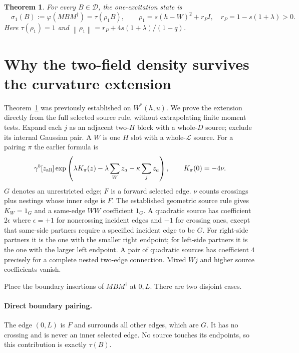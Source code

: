 \documentclass[11pt]{article}
\newcommand{\norm}[1]{\left\lVert#1\right\rVert}
\newcommand{\D}{\mathcal D}
\newtheorem{theorem}{Theorem}
\begin{document}
\begin{theorem}\label{density}
For every $B\in\D$, the one-excitation state is
\begin{equation}\boxed{\quad
 \sigma_1(B):=\varphi(MBM^\dagger)=\tau(\rho_1B),\qquad
 \rho_1=s(h-W)^2+r_PI,\quad r_P=1-s(1+\lambda)>0.\quad}\label{rho}
\end{equation}
Here $\tau(\rho_1)=1$ and
$\norm{\rho_1}=r_P+4s(1+\lambda)/(1-q)$.
\end{theorem}

\newpage
\section{Why the two-field density survives the curvature extension}
Theorem~\ref{density} was previously established on $W^*(h,u)$.
We prove the extension directly from the full selected source rule,
without extrapolating finite moment tests. Expand each $j$ as an
adjacent two-$H$ block with a whole-$D$ source; exclude its internal
Gaussian pair. A $W$ is one $H$ slot with a whole-$\mathcal L$ source.
For a pairing $\pi$ the earlier formula is
\begin{equation}\label{source}
 \gamma^b[z_{\rm all}]
 \exp\left(\lambda K_\pi(z)-\lambda\sum_Wz_a-\kappa\sum_jz_a\right),
 \qquad K_\pi(0)=-4\nu .
\end{equation}
$G$ denotes an unrestricted edge; $F$ is a forward selected edge.
$\nu$ counts crossings plus nestings whose inner edge is $F$.
The established geometric source rule gives $K_W=1_G$ and a same-edge
$WW$ coefficient $1_G$. A quadratic source has coefficient $2\epsilon$
where $\epsilon=+1$ for noncrossing incident edges and $-1$ for crossing
ones, except that same-side partners require a specified incident edge
to be $G$. For right-side partners it is the one with the smaller right
endpoint; for left-side partners it is the one with the larger left
endpoint. A pair of quadratic sources has coefficient $4$ precisely
for a complete nested two-edge connection. Mixed $Wj$ and higher
source coefficients vanish.

Place the boundary insertions of $MBM^\dagger$ at $0,L$.
There are two disjoint cases.

\paragraph{Direct boundary pairing.}
The edge $(0,L)$ is $F$ and surrounds all other edges, which are $G$.
It has no crossing and is never an inner selected edge. No source
touches its endpoints, so this contribution is exactly $\tau(B)$.
\end{document}
